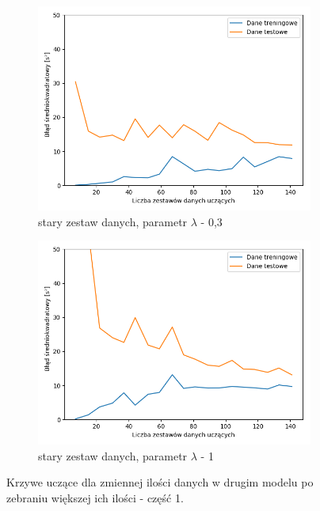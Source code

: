 \documentclass[12pt]{aghdpl}
\begin{document}
		\begin{figure}[h]
			\centering
			\begin{subfigure}{.8\linewidth}
		 		\includegraphics[width =\linewidth]{wykresy/8_zebranie_wiekszej_ilosci_danych/0-200/regularyzacja_0_3_learning_curves.png}
		 		\caption{stary zestaw danych, parametr $\lambda$ - 0,3}
		 	\end{subfigure}
		 	\begin{subfigure}{.8\linewidth}
		 		\includegraphics[width =\linewidth]{wykresy/8_zebranie_wiekszej_ilosci_danych/0-200/regularyzacja_1_learning_curves.png}
		 		\caption{stary zestaw danych, parametr $\lambda$ - 1}
		 	\end{subfigure}
		
			\caption{Krzywe uczące dla zmiennej ilości danych w drugim modelu po zebraniu większej ich ilości - część 1.}
			\label{fig: drugi_model_po_zebraniu_wiekszej_ilosci_danych_learning_curves_1}
		\end{figure}
		
\end{document}
